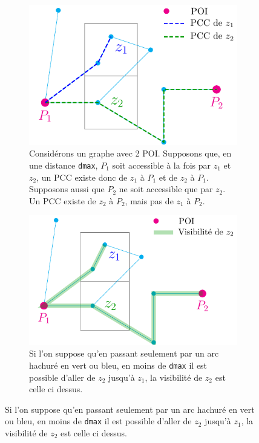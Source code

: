 \begin{figure}[H]
    \centering
    \begin{subfigure}[t]{0.3\textwidth}
        \centering
        \includegraphics[width=0.92\linewidth]{PDFs/graph.pdf}
    \caption{Considérons un graphe avec 2 POI. Supposons que, en une distance \texttt{dmax}, $P_1$ soit accessible à la fois par $z_1$ et $z_2$, un PCC existe donc de $z_1$ à $P_1$ et de $z_2$ à $P_1$. Supposons aussi que $P_2$ ne soit accessible que par $z_2$. Un PCC existe de $z_2$ à $P_2$, mais pas de $z_1$ à $P_2$. }
    \end{subfigure}
    \hfill
    \begin{subfigure}[t]{0.3\textwidth}
        \centering
        \includegraphics[width=1\linewidth]{PDFs/visi_z2.pdf}
    \caption{Si l'on suppose qu'en passant seulement par un arc hachuré en vert ou bleu, en moins de \texttt{dmax} il est possible d'aller de $z_2$ jusqu'à $z_1$, la visibilité de $z_2$ est celle ci dessus.}
    \end{subfigure}

\end{figure}
